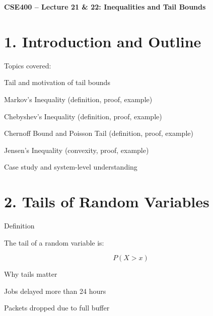 \documentclass[12pt]{article}
\begin{document}
\begin{center}
\textbf{\Large CSE400 -- Lecture 21 \& 22: Inequalities and Tail Bounds}
\end{center}

\vspace{1em}

\section*{1. Introduction and Outline}

\vspace{0.5em}

Topics covered:

\vspace{0.5em}

Tail and motivation of tail bounds

Markov’s Inequality (definition, proof, example)

Chebyshev’s Inequality (definition, proof, example)

Chernoff Bound and Poisson Tail (definition, proof, example)

Jensen’s Inequality (convexity, proof, example)

Case study and system-level understanding

\vspace{1.5em}

\section*{2. Tails of Random Variables}

\vspace{0.5em}

Definition

\vspace{0.5em}

The tail of a random variable is:

\vspace{0.5em}

\[
P(X > x)
\]

\vspace{1em}

Why tails matter

\vspace{0.5em}

Jobs delayed more than 24 hours

Packets dropped due to full buffer

\vspace{1em}
\end{document}
